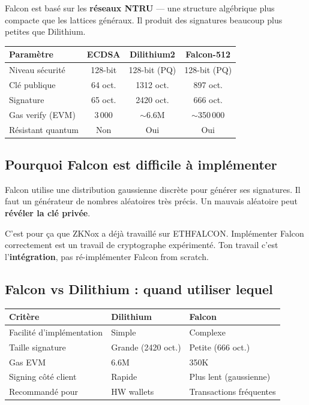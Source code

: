 \documentclass[12pt, a4paper]{article}
\begin{document}
Falcon est basé sur les \textbf{réseaux NTRU} --- une structure algébrique plus compacte
que les lattices généraux. Il produit des signatures beaucoup plus petites que Dilithium.

\begin{center}
\renewcommand{\arraystretch}{1.5}
\begin{tabular}{lccc}
  \toprule
  \textbf{Paramètre} & \textbf{ECDSA} & \textbf{Dilithium2} & \textbf{Falcon-512} \\
  \midrule
  Niveau sécurité & 128-bit & 128-bit (PQ) & 128-bit (PQ) \\
  Clé publique & 64 oct. & 1312 oct. & 897 oct. \\
  Signature & 65 oct. & 2420 oct. & 666 oct. \\
  Gas verify (EVM) & 3\,000 & $\sim$6.6M & $\sim$350\,000 \\
  Résistant quantum & \textcolor{danger_red}{Non} & \textcolor{sol_green}{Oui} & \textcolor{sol_green}{Oui} \\
  \bottomrule
\end{tabular}
\end{center}

\subsection{Pourquoi Falcon est difficile à implémenter}

Falcon utilise une distribution gaussienne discrète pour générer ses signatures.
Il faut un générateur de nombres aléatoires très précis.
Un mauvais aléatoire peut \textbf{révéler la clé privée}.

\begin{attention}
C'est pour ça que ZKNox a déjà travaillé sur ETHFALCON. Implémenter Falcon
correctement est un travail de cryptographe expérimenté. Ton travail c'est
l'\textbf{intégration}, pas ré-implémenter Falcon from scratch.
\end{attention}

\subsection{Falcon vs Dilithium : quand utiliser lequel}

\begin{center}
\renewcommand{\arraystretch}{1.4}
\begin{tabular}{lll}
  \toprule
  \textbf{Critère} & \textbf{Dilithium} & \textbf{Falcon} \\
  \midrule
  Facilité d'implémentation & Simple & Complexe \\
  Taille signature & Grande (2420 oct.) & Petite (666 oct.) \\
  Gas EVM & 6.6M & 350K \\
  Signing côté client & Rapide & Plus lent (gaussienne) \\
  Recommandé pour & HW wallets & Transactions fréquentes \\
  \bottomrule
\end{tabular}
\end{center}
\end{document}
